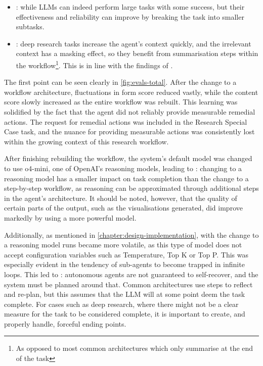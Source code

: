 \documentclass[a4paper]{report}
\begin{document}
\begin{itemize}
    \item {}\kfid : while LLMs can indeed perform large tasks with some success, but their effectiveness and reliability can improve by breaking the task into smaller subtasks.
    \item {}\kfid : deep research tasks increase the agent's context quickly, and the irrelevant context has a masking effect, so they benefit from summarisation steps within the workflow\footnote{As opposed to most common architectures which only summarise at the end of the task}. This is in line with the findings of \cite{veseli2025positionalbiasesshiftinputs}.
\end{itemize}

The first point can be seen clearly in \autoref{fig:evals-total}. After the change to a workflow architecture, fluctuations in form score reduced vastly, while the content score slowly increased as the entire workflow was rebuilt. This learning was solidified by the fact that the agent did not reliably provide measurable remedial actions. The request for remedial actions was included in the Research Special Case task, and the nuance for providing measurable actions was consistently lost within the growing context of this research workflow.

After finishing rebuilding the workflow, the system's default model was changed to use o4-mini, one of OpenAI's reasoning models, leading to \kfid : changing to a reasoning model has a smaller impact on task completion than the change to a step-by-step workflow, as reasoning can be approximated through additional steps in the agent's architecture. It should be noted, however, that the quality of certain parts of the output, such as the visualisations generated, did improve markedly by using a more powerful model.

Additionally, as mentioned in \autoref{chapter:design-implementation}, with the change to a reasoning model runs became more volatile, as this type of model does not accept configuration variables such as Temperature, Top K or Top P. This was especially evident in the tendency of sub-agents to become trapped in infinite loops. This led to \kfid : autonomous agents are not guaranteed to self-recover, and the system must be planned around that. Common architectures use steps to reflect and re-plan, but this assumes that the LLM will at some point deem the task complete. For cases such as deep research, where there might not be a clear measure for the task to be considered complete, it is important to create, and properly handle, forceful ending points.
\end{document}
